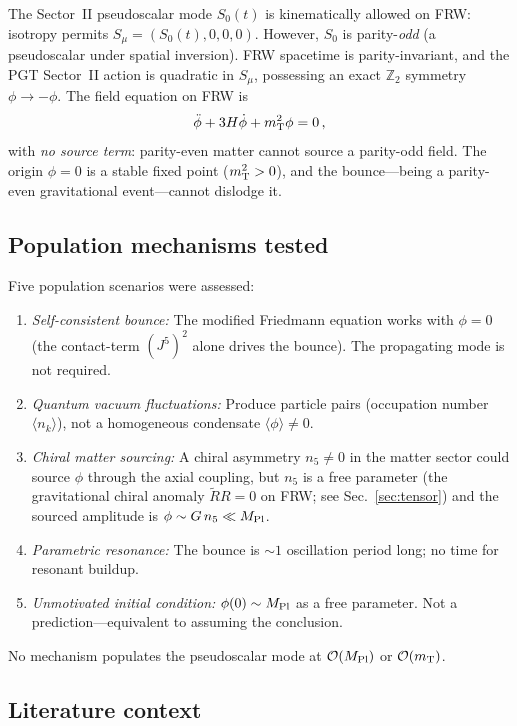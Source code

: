 \documentclass[aps,prd,twocolumn,superscriptaddress,showpacs,preprintnumbers,
  nofootinbib,longbibliography,floatfix]{revtex4-2}
\newcommand{\MPl}{M_{\rm Pl}}
\newcommand{\mT}{m_{\rm T}}
\begin{document}
The Sector~II pseudoscalar mode $S_0(t)$ is kinematically allowed on FRW:
isotropy permits $S_\mu = (S_0(t), 0, 0, 0)$. However, $S_0$ is
parity-\textit{odd} (a pseudoscalar under spatial inversion). FRW
spacetime is parity-invariant, and the PGT Sector~II action is quadratic
in $S_\mu$, possessing an exact $\mathbb{Z}_2$ symmetry $\phi \to -\phi$.
The field equation on FRW is
\begin{equation}\label{eq:torsion_kg}
  \ddot{\phi} + 3H\dot{\phi} + \mT^2 \phi = 0\,,
\end{equation}
with \textit{no source term}: parity-even matter cannot source a
parity-odd field. The origin $\phi = 0$ is a stable fixed point
($\mT^2 > 0$), and the bounce---being a parity-even gravitational
event---cannot dislodge it.

\subsection{Population mechanisms tested}

Five population scenarios were assessed:
\begin{enumerate}[leftmargin=*]
  \item \textit{Self-consistent bounce:} The modified Friedmann equation
    works with $\phi = 0$ (the contact-term $(J^5)^2$ alone drives the
    bounce). The propagating mode is not required.
  \item \textit{Quantum vacuum fluctuations:} Produce particle pairs
    (occupation number $\langle n_k \rangle$), not a homogeneous
    condensate $\langle\phi\rangle \neq 0$.
  \item \textit{Chiral matter sourcing:} A chiral asymmetry $n_5 \neq 0$
    in the matter sector could source $\phi$ through the axial coupling,
    but $n_5$ is a free parameter (the gravitational chiral anomaly
    $\tilde{R}R = 0$ on FRW; see Sec.~\ref{sec:tensor}) and the sourced
    amplitude is $\phi \sim G\,n_5 \ll \MPl$.
  \item \textit{Parametric resonance:} The bounce is $\sim\!1$ oscillation
    period long; no time for resonant buildup.
  \item \textit{Unmotivated initial condition:} $\phi(0) \sim \MPl$ as a
    free parameter. Not a prediction---equivalent to assuming the
    conclusion.
\end{enumerate}
No mechanism populates the pseudoscalar mode at $\mathcal{O}(\MPl)$ or
$\mathcal{O}(\mT)$.

\subsection{Literature context}
\end{document}
